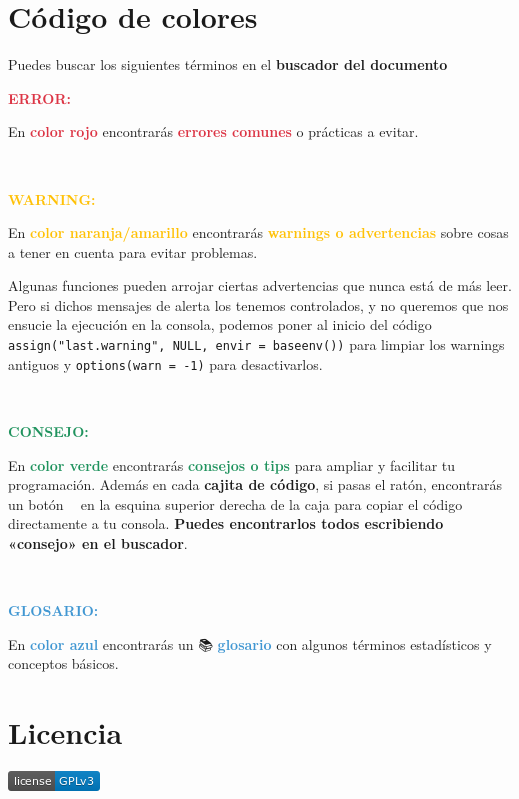 \documentclass[11pt,]{book}
\begin{document}
\hypertarget{cuxf3digo-de-colores}{%
\section*{Código de colores}\label{cuxf3digo-de-colores}}


Puedes buscar los siguientes términos en el \textbf{buscador del documento}

\textbf{\textcolor{#dc3545}{ERROR:}}

En \textbf{\textcolor{#dc3545}{color rojo}} encontrarás \textbf{\textcolor{#dc3545}{errores comunes}} o prácticas a evitar.

~

\textbf{\textcolor{#ffc107}{WARNING:}}

En \textbf{\textcolor{#ffc107}{color naranja/amarillo}} encontrarás \textbf{\textcolor{#ffc107}{warnings o advertencias}} sobre cosas a tener en cuenta para evitar problemas.

Algunas funciones pueden arrojar ciertas advertencias que nunca está de más leer. Pero si dichos mensajes de alerta los tenemos controlados, y no queremos que nos ensucie la ejecución en la consola, podemos poner al inicio del código \texttt{assign("last.warning",\ NULL,\ envir\ =\ baseenv())} para limpiar los warnings antiguos y \texttt{options(warn\ =\ -1)} para desactivarlos.

~

\textbf{\textcolor{#20935E}{CONSEJO:}}

En \textbf{\textcolor{#20935E}{color verde}} encontrarás \textbf{\textcolor{#20935E}{consejos o tips}} para ampliar y facilitar tu programación. Además en cada \textbf{cajita de código}, si pasas el ratón, encontrarás un botón 📄📄 en la esquina superior derecha de la caja para copiar el código directamente a tu consola. \textbf{Puedes encontrarlos todos escribiendo «consejo» en el buscador}.

~

\textbf{\textcolor{#4197D2}{GLOSARIO:}}

En \textbf{\textcolor{#4197D2}{color azul}} encontrarás un 📚 \textbf{\textcolor{#4197D2}{glosario}} con algunos términos estadísticos y conceptos básicos.

\hypertarget{licencia}{%
\section*{Licencia}\label{licencia}}


\href{https://www.gnu.org/licenses/gpl-3.0}{\includegraphics{img/license-GPLv3-blue.png}}
\end{document}
